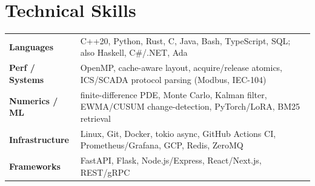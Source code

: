 \documentclass[10pt]{article}
\begin{document}
\section*{Technical Skills}
\noindent
\begin{tabular}{@{}p{2.7cm}p{15.5cm}@{}}
\textbf{Languages} & C++20, Python, Rust, C, Java, Bash, TypeScript, SQL; also Haskell, C\#/.NET, Ada \\
\textbf{Perf / Systems} & OpenMP, cache-aware layout, acquire/release atomics, ICS/SCADA protocol parsing (Modbus, IEC-104) \\
\textbf{Numerics / ML} & finite-difference PDE, Monte Carlo, Kalman filter, EWMA/CUSUM change-detection, PyTorch/LoRA, BM25 retrieval \\
\textbf{Infrastructure} & Linux, Git, Docker, tokio async, GitHub Actions CI, Prometheus/Grafana, GCP, Redis, ZeroMQ \\
\textbf{Frameworks} & FastAPI, Flask, Node.js/Express, React/Next.js, REST/gRPC \\
\end{tabular}
\end{document}

